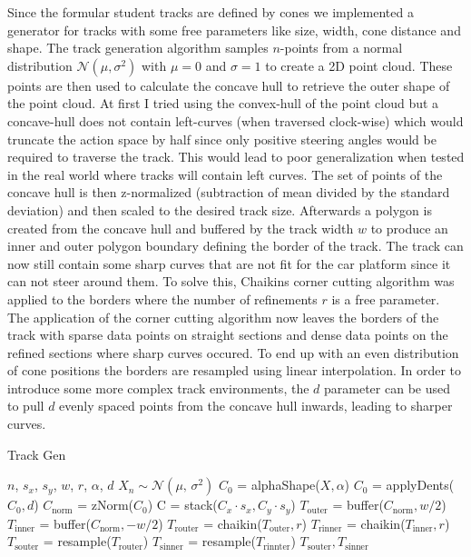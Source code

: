 Since the formular student tracks are defined by cones we implemented a generator for tracks with some free parameters like size, width, cone distance and shape.
The track generation algorithm samples $n$-points from a normal distribution $\mathcal{N}(\mu, \sigma^2)$ with $\mu = 0$ and $\sigma = 1$ to create a 2D point cloud. These points are then used to calculate the concave hull to retrieve the outer shape of the point cloud. At first I tried using the convex-hull of the point cloud but a concave-hull does not contain left-curves (when traversed clock-wise) which would truncate the action space by half since only positive steering angles would be required to traverse the track. This would lead to poor generalization when tested in the real world where tracks will contain left curves. The set of points of the concave hull is then z-normalized (subtraction of mean divided by the standard deviation) and then scaled to the desired track size.
Afterwards a polygon is created from the concave hull and buffered by the track width $w$ to produce an inner and outer polygon boundary defining the border of the track. The track can now still contain some sharp curves that are not fit for the car platform since it can not steer around them. To solve this, Chaikins corner cutting algorithm \cite{chaikin1974algorithm} was applied to the borders where the number of refinements $r$ is a free parameter.
The application of the corner cutting algorithm now leaves the borders of the track with sparse data points on straight sections and dense data points on the refined sections where sharp curves occured. To end up with an even distribution of cone positions the borders are resampled using linear interpolation.
In order to introduce some more complex track environments, the $d$ parameter can be used to pull $d$ evenly spaced points from the concave hull inwards, leading to sharper curves.

\begin{algorithm}[tb]
\caption{Track Gen}
\label{alg:track-gen}
\begin{algorithmic}
 $n$, $s_x$, $s_y$, $w$, $r$, $\alpha$, $d$
\State $X_n \sim \mathcal{N}(\mu,\,\sigma^{2})$
\State $C_0$ = alphaShape($X, \alpha$)
\State $C_0$ = applyDents($C_0, d$)
\State $C_\text{norm}$ = zNorm($C_0$)
\State C = stack($C_x \cdot s_x, C_y \cdot s_y$)
\State $T_\text{outer}$ = buffer($C_\text{norm}, w/2$)
\State $T_\text{inner}$ = buffer($C_\text{norm}, -w/2$)
\State $T_\text{router}$ = chaikin($T_\text{outer}, r$)
\State $T_\text{rinner}$ = chaikin($T_\text{inner}, r$)
\State $T_\text{souter}$ = resample($T_\text{router}$)
\State $T_\text{sinner}$ = resample($T_\text{rinnter}$)
 $T_\text{souter}, T_\text{sinner}$
\end{algorithmic}
\end{algorithm}

